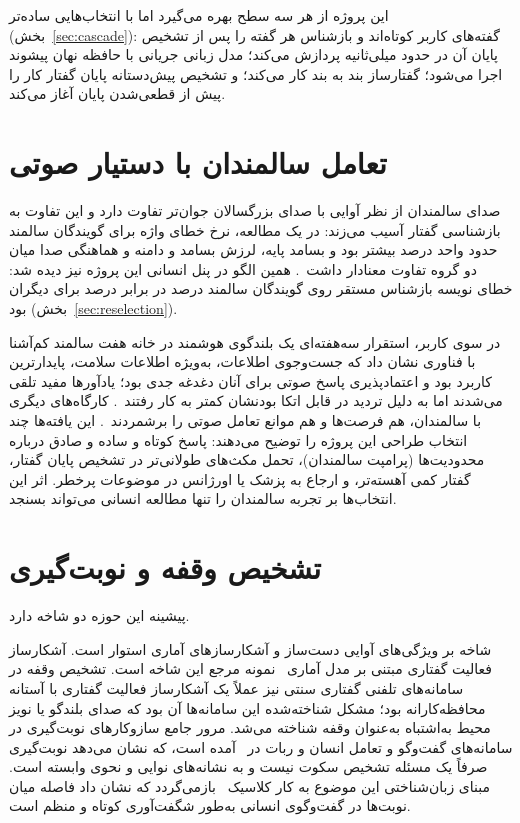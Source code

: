 این پروژه از هر سه سطح بهره می‌گیرد اما با انتخاب‌هایی ساده‌تر
(بخش~\ref{sec:cascade}): گفته‌های کاربر کوتاه‌اند و بازشناس
 هر گفته را پس از تشخیص پایان آن در حدود  میلی‌ثانیه پردازش
می‌کند؛ مدل زبانی جریانی با حافظه نهان پیشوند اجرا می‌شود؛ گفتارساز بند به بند
کار می‌کند؛ و تشخیص پیش‌دستانه پایان گفتار کار را پیش از قطعی‌شدن پایان آغاز
می‌کند.

\section{تعامل سالمندان با دستیار صوتی}
\label{sec:elderly-lit}

صدای سالمندان از نظر آوایی با صدای بزرگسالان جوان‌تر تفاوت دارد و این تفاوت
به بازشناسی گفتار آسیب می‌زند: در یک مطالعه، نرخ خطای واژه برای گویندگان
سالمند حدود  واحد درصد بیشتر بود و بسامد پایه، لرزش بسامد و دامنه و
هماهنگی صدا میان دو گروه تفاوت معنادار داشت~\cite{vipperla2010ageing}. همین
الگو در پنل انسانی این پروژه نیز دیده شد: خطای نویسه بازشناس مستقر روی
گویندگان سالمند  درصد در برابر  درصد برای دیگران بود
(بخش~\ref{sec:reselection}).

در سوی کاربر، استقرار سه‌هفته‌ای یک بلندگوی هوشمند در خانه هفت سالمند کم‌آشنا
با فناوری نشان داد که جست‌وجوی اطلاعات، به‌ویژه اطلاعات سلامت، پایدارترین
کاربرد بود و اعتمادپذیری پاسخ صوتی برای آنان دغدغه جدی بود؛ یادآورها مفید
تلقی می‌شدند اما به دلیل تردید در قابل اتکا بودنشان کمتر به کار
رفتند~\cite{pradhan2020olderadults}. کارگاه‌های دیگری با سالمندان، هم فرصت‌ها و
هم موانع تعامل صوتی را برشمردند~\cite{kowalski2019olderadults}. این یافته‌ها
چند انتخاب طراحی این پروژه را توضیح می‌دهند: پاسخ کوتاه و ساده و صادق درباره
محدودیت‌ها (پرامپت سالمندان)، تحمل مکث‌های طولانی‌تر در تشخیص پایان گفتار،
گفتار کمی آهسته‌تر، و ارجاع به پزشک یا اورژانس در موضوعات پرخطر. اثر این
انتخاب‌ها بر تجربه سالمندان را تنها مطالعه انسانی می‌تواند بسنجد.

\section{تشخیص وقفه و نوبت‌گیری}
\label{sec:bargein-lit}

پیشینه این حوزه دو شاخه دارد.

شاخه  بر ویژگی‌های آوایی دست‌ساز و آشکارسازهای آماری استوار
است. آشکارساز فعالیت گفتاری مبتنی بر مدل آماری~\cite{sohn1999vad} نمونه
مرجع این شاخه است. تشخیص وقفه در سامانه‌های تلفنی گفتاری سنتی نیز عملاً یک
آشکارساز فعالیت گفتاری با آستانه محافظه‌کارانه بود؛ مشکل شناخته‌شده این
سامانه‌ها آن بود که صدای بلندگو یا نویز محیط به‌اشتباه به‌عنوان وقفه
شناخته می‌شد. مرور جامع سازوکارهای نوبت‌گیری در سامانه‌های گفت‌وگو و تعامل
انسان و ربات در~\cite{skantze2021turntaking} آمده است، که نشان می‌دهد
نوبت‌گیری صرفاً یک مسئله تشخیص سکوت نیست و به نشانه‌های نوایی و نحوی
وابسته است. مبنای زبان‌شناختی این موضوع به کار کلاسیک~\cite{sacks1974turntaking}
بازمی‌گردد که نشان داد فاصله میان نوبت‌ها در گفت‌وگوی انسانی به‌طور شگفت‌آوری
کوتاه و منظم است.

